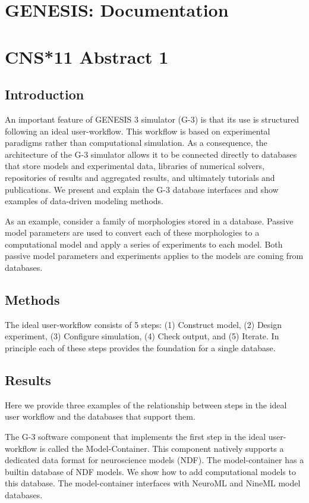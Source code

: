\documentclass[12pt]{article}
\begin{document}
\section*{GENESIS: Documentation}

\section*{CNS*11 Abstract 1}

\subsection*{Introduction}

An important feature of GENESIS 3 simulator (G-3) is that its use is
structured following an ideal user-workflow.  This workflow is based
on experimental paradigms rather than computational simulation.  As a
consequence, the architecture of the G-3 simulator allows it to be
connected directly to databases that store models and experimental
data, libraries of numerical solvers, repositories of results and
aggregated results, and ultimately tutorials and publications.  We
present and explain the G-3 database interfaces and show examples of
data-driven modeling methods.

As an example, consider a family of morphologies stored in a database.
Passive model parameters are used to convert each of these
morphologies to a computational model and apply a series of
experiments to each model.  Both passive model parameters and
experiments applies to the models are coming from databases.


\subsection*{Methods}

The ideal user-workflow consists of 5 steps: (1) Construct model, (2) Design experiment, (3) Configure simulation, (4) Check output, and (5) Iterate.
In principle each of these steps provides the foundation for a single database. 

\subsection*{Results}

Here we provide three examples of the relationship between steps in the ideal user workflow and the databases that support them.

The G-3 software component that implements the first step in the ideal
user-workflow is called the Model-Container.  This component
natively supports a dedicated data format for neuroscience models
(NDF).  The model-container has a builtin database of NDF models.  We
show how to add computational models to this database.  The
model-container interfaces with NeuroML and NineML model databases.
\end{document}
